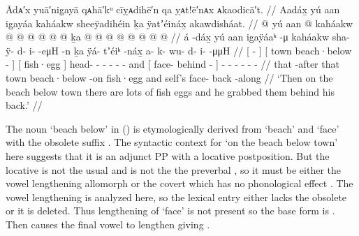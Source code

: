 \ex\label{ex:100-49-grab-eggs}%
%
\begingl
	\glpreamble	Ādᴀ′x yuā′nig̣ayā qᴀhā′kᵘ cīỵᴀdihē′n qa ỵᴀt!ē′nᴀx ᴀkaodicā′t. //
	\glpreamble	Aadáx̱ yú aan ig̱ayáa kaháakw sheeÿadihéin ḵa ÿatʼéináx̱ akawdisháat. //
	\gla	{}  @ {} {}
		{} yú aan  @ {} {}
		{} kaháakw {}
		 @ {} @ {} @ {} @ {} @ {} @ {}
		ḵa
		{} {}  @ {} @ {} {}
		 @ {} @ {} @ {} @ {} @ {} @ {} //
	\glb	{} á -dáx̱ {}
		{} yú aan ig̱aÿáaᵏ -μ {}
		{} kaháakw {}
		sha- ÿ- d- i-  -eμH -n
		ḵa
		{} {} ÿá- tʼéiᵏ -náx̱ {}
		a- k- wu- d- i-  -μμH //
	\glc	{}[  - {}]
		{}[  town beach·below - {}]
		{}[ fish·egg {}]
		head- - - -  - -
		and 
		{}[  face- behind - {}]
		- - - - -  - //
	\gld	{} that -after {}
		{} that town beach·below -on {}
		{} fish·egg {}
		 {} {} {} {} {} {}
		and
		{} self’s face- back -along {}
		 {} {} {} {} {} {} //
	\glft	‘Then on the beach below town there are lots of fish eggs and he grabbed them behind his back.’
		//
\endgl
\xe

The noun  ‘beach below’ in (\lastx) is etymologically derived from  ‘beach’ and  ‘face’ with the obsolete  suffix \parencite[02/286]{leer:1973}.
The syntactic context for  ‘on the beach below town’ here suggests that it is an adjunct PP with a locative postposition.
But the locative is not the usual  and is not the the preverbal , so it must be either the vowel lengthening  allomorph or the covert  which has no phonological effect \parencite[33–34]{leer:1991}.
The vowel lengthening  is analyzed here, so the lexical entry either lacks the obsolete  or it is deleted.
Thus lengthening of  ‘face’ is not present so the base form is .
Then  causes the final vowel to lengthen giving .

